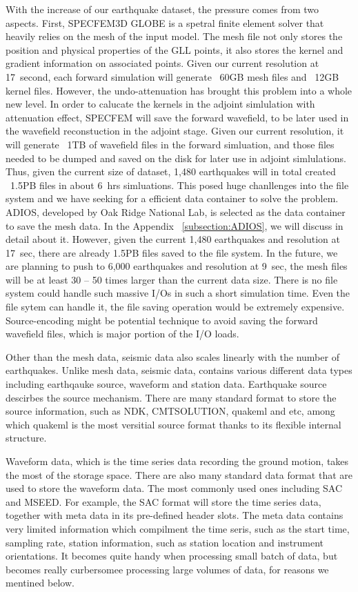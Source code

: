 With the increase of our earthquake dataset, the pressure comes from two aspects.
First, SPECFEM3D GLOBE is a spetral finite element solver that heavily
relies on the mesh of the input model. The mesh file not only stores
the position and physical properties of the GLL points, it also stores
the kernel and gradient information on associated points. Given our current
resolution at 17~second, each forward simulation will generate ~60GB mesh
files and ~12GB kernel files. However, the undo-attenuation has brought this
problem into a whole new level. In order to calucate the kernels in the adjoint
simlulation with attenuation effect, SPECFEM will save the forward wavefield,
to be later used in the wavefield reconstuction in the adjoint stage.
Given our current resolution,
it will generate ~1TB of wavefield files in the forward simluation, and those
files needed to be dumped and saved on the disk for later use in adjoint simlulations.
Thus, given the current size of dataset,
1,480 earthquakes will in total created ~1.5PB files in about 6~hrs simluations.
This posed huge chanllenges into the file system and we have seeking for
a efficient data container to solve the problem. ADIOS, developed by Oak Ridge
National Lab, is selected as the data container to save the mesh data.
In the Appendix ~\ref{subsection:ADIOS}, we will discuss in detail about it.
However, given the current 1,480 earthquakes and resolution at 17~sec,
there are already 1.5PB files saved to the file system. In the future, we are
planning to push to 6,000 earthquakes and resolution at 9~sec, the mesh files
will be at least 30 -- 50 times larger than the current data size. There is no file
system could handle such massive I/Os in such a short simulation time. Even
the file sytem can handle it, the file saving operation would be extremely 
expensive. Source-encoding might be potential technique to avoid saving the forward
wavefield files, which is major portion of the I/O loads.

Other than the mesh data, seismic data also scales linearly with the number
of earthquakes. Unlike mesh data, seismic data, contains various different
data types including earthqauke source, waveform and station data.
Earthquake source descirbes the source mechanism. There are many standard
format to store the source information, such as NDK, CMTSOLUTION, quakeml and etc,
among which quakeml is the most versitial source format thanks to its flexible
internal structure.

Waveform data, which is the time series data recording the ground motion, takes
the most of the storage space.
There are also many standard data format that are used to store the waveform
data. The most commonly used ones including SAC and MSEED. For example, the SAC format
will store the time series data, together with meta data
in its pre-defined header slots. The meta data contains very limited information
which compilment the time seris, such as the start time, sampling rate, station
information, such as station location and instrument orientations. It becomes quite
handy when processing small batch of data, but becomes really curbersomee processing
large volumes of data, for reasons we mentined below.

